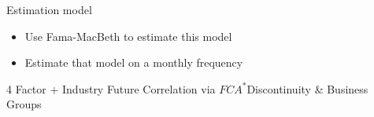 \documentclass{beamer}
\begin{document}
	

	
	
	\begin{frame}{Estimation model}
		\begin{itemize}
			\item Use Fama-MacBeth to estimate this model
			
			
			
			\item Estimate that model on a monthly frequency 
		\end{itemize}
	\end{frame}
	
	
	
	
	
	

		
		\begin{frame}{ 4 Factor + Industry Future  Correlation via $ FCA^* $}{Discontinuity \&  Business Groups}\label{Monthly19}
		
		
		
		
		

\end{frame}
\end{document}
